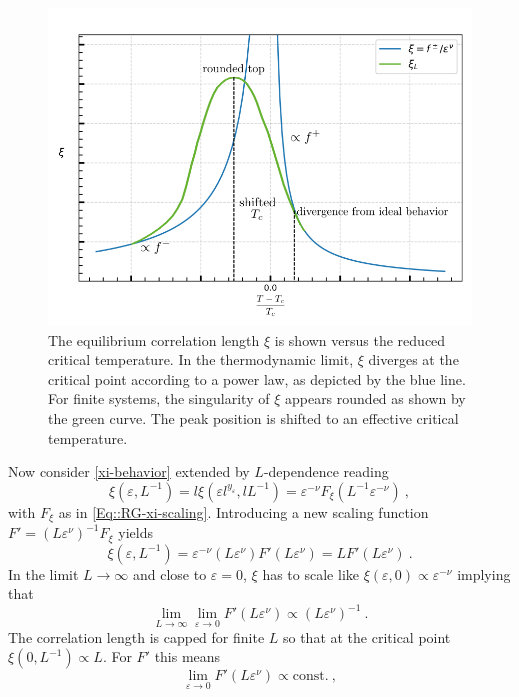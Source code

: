 	\begin{figure}[htp]
		\centering
		\includegraphics[width=0.7\linewidth]{graphics/xi-divergence4.png}
		\caption{The equilibrium correlation length $\xi$ is shown versus the reduced critical temperature. In the thermodynamic limit, $\xi$ diverges at the critical point according to a power law, as depicted by the blue line. For finite systems, the singularity of $\xi$ appears rounded as shown by the green curve. The peak position is shifted to an effective critical temperature.}
		\label{xi-divergence-FS}
	\end{figure}
	Now consider \autoref{xi-behavior} extended by $L$-dependence reading
	\begin{equation}
		\xi(\varepsilon, L^{-1}) =	l \xi (\varepsilon l^{y_\varepsilon}, l L^{-1}) = \varepsilon^{-\nu} F_\xi (L^{-1} \varepsilon^{-\nu})~,
	\end{equation}
	with $F_\xi$ as in \autoref{Eq::RG-xi-scaling}. Introducing a new scaling function $F' =	(L \varepsilon^\nu)^{-1} F_\xi$ yields
	\begin{equation}
		\xi(\varepsilon, L^{-1}) = \varepsilon^{-\nu} (L\varepsilon^\nu) F' (L \varepsilon^{\nu}) =	L	F'(L \varepsilon^\nu)~.
	\end{equation}
	In the limit $L \rightarrow \infty$ and close to $\varepsilon =	0$, $\xi$ has to scale like $\xi(\varepsilon, 0) \propto \varepsilon^{-\nu}$ implying that
	\begin{equation}
		\lim_{L \rightarrow \infty} \lim_{\varepsilon \rightarrow 0} F'(L \varepsilon^\nu) \propto (L \varepsilon^\nu)^{-1}~.
	\end{equation}
	The correlation length is capped for finite $L$ so that at the critical point $\xi(0, L^{-1}) \propto L$. For $F'$ this means
	\begin{equation}
		\lim_{\varepsilon \rightarrow 0} F'(L\varepsilon^\nu) \propto \text{const.}~,
	\end{equation}
